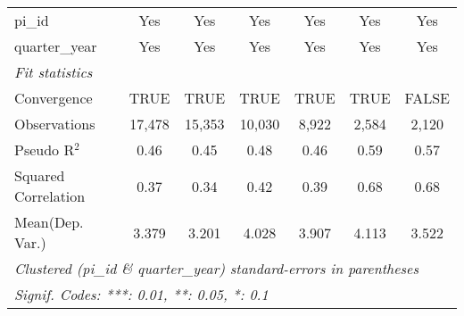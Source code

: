 \begin{tabular}{lcccccc}
   pi\_id                                                     & Yes            & Yes            & Yes           & Yes           & Yes           & Yes\\  
   quarter\_year                                              & Yes            & Yes            & Yes           & Yes           & Yes           & Yes\\  
   \midrule
   \emph{Fit statistics}\\
   Convergence                                                &TRUE            & TRUE           & TRUE          & TRUE          & TRUE          & FALSE\\  
   Observations                                               & 17,478         & 15,353         & 10,030        & 8,922         & 2,584         & 2,120\\  
   Pseudo R$^2$                                               & 0.46           & 0.45           & 0.48          & 0.46          & 0.59          & 0.57\\  
   Squared Correlation                                        & 0.37           & 0.34           & 0.42          & 0.39          & 0.68          & 0.68\\  
Mean(Dep. Var.) & 3.379 & 3.201 & 4.028 & 3.907 & 4.113 & 3.522 \\
   \midrule \midrule
   \multicolumn{7}{l}{\emph{Clustered (pi\_id \& quarter\_year) standard-errors in parentheses}}\\
   \multicolumn{7}{l}{\emph{Signif. Codes: ***: 0.01, **: 0.05, *: 0.1}}\\
\end{tabular}
\par\endgroup
